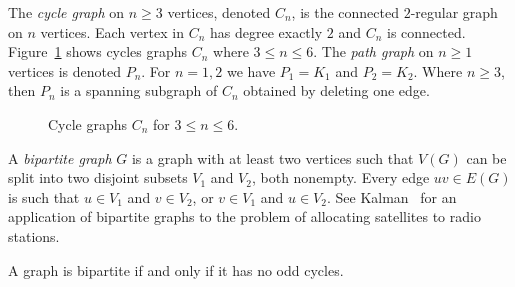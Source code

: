 The \emph{cycle graph} on $n \geq 3$ vertices,
denoted $C_n$, is the connected $2$-regular graph on $n$
vertices. Each vertex in $C_n$ has degree exactly $2$ and $C_n$ is
connected. Figure~\ref{fig:introduction:four_cycle_graphs} shows
cycles graphs $C_n$ where $3 \leq n \leq 6$. The
\emph{path graph} on $n \geq 1$ vertices is denoted
$P_n$. For $n = 1, 2$ we have $P_1 = K_1$ and
$P_2 = K_2$. Where $n \geq 3$, then $P_n$ is a spanning subgraph of
$C_n$ obtained by deleting one edge.

\begin{figure}[!htbp]
\centering
{}

\caption{Cycle graphs $C_n$ for $3 \leq n \leq 6$.}
\label{fig:introduction:four_cycle_graphs}
\end{figure}

A \emph{bipartite graph} $G$ is a graph with at
least two vertices such that $V(G)$ can be split into two disjoint
subsets $V_1$ and $V_2$, both nonempty. Every edge $uv \in E(G)$ is
such that $u \in V_1$ and $v \in V_2$, or $v \in V_1$ and $u \in V_2$.
See Kalman~\cite{Kalman1999} for an application of bipartite graphs to
the problem of allocating satellites to radio stations.

\begin{theorem}
A graph is bipartite if and only if it has no odd cycles.
\end{theorem}

